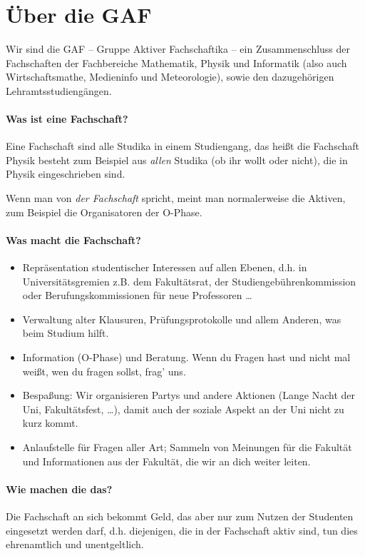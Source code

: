 \section{Über die GAF}

Wir sind die GAF -- Gruppe Aktiver Fachschaftika -- ein
Zusammenschluss der Fachschaften der Fachbereiche
Mathematik,
Physik
und Informatik (also auch Wirtschaftsmathe, Medieninfo und
Meteorologie), sowie den dazugehörigen Lehramtsstudiengängen.

\paragraph{Was ist eine Fachschaft?}

Eine Fachschaft sind alle Studika in einem Studiengang, das heißt die Fachschaft Physik besteht zum Beispiel aus \emph{allen} Studika (ob ihr wollt oder nicht), die in Physik eingeschrieben sind.

Wenn man von \emph{der Fachschaft} spricht, meint man normalerweise die Aktiven,
zum Beispiel die Organisatoren der O-Phase.

\paragraph{Was macht die Fachschaft?}
\begin{itemize}
\item Repräsentation studentischer Interessen auf allen Ebenen, d.h. in Universitätsgremien z.B. dem Fakultätsrat, der Studiengebührenkommission oder Berufungskommissionen für neue Professoren \ldots
\item Verwaltung alter Klausuren, Prüfungsprotokolle und allem Anderen, was beim Studium hilft.
\item Information (O-Phase) und Beratung. Wenn du Fragen hast und nicht mal weißt, wen du fragen sollst, frag' uns.
\item Bespaßung: Wir organisieren Partys und andere Aktionen (Lange Nacht der Uni, Fakultätsfest, \ldots), damit auch der soziale Aspekt an der Uni nicht zu kurz kommt.
\item Anlaufstelle für Fragen aller Art; Sammeln von Meinungen für die Fakultät und Informationen aus der Fakultät, die wir an dich weiter leiten.
\end{itemize}

\paragraph{Wie machen die das?}
Die Fachschaft an sich bekommt Geld, das aber nur zum Nutzen der
Studenten eingesetzt werden darf, d.h. diejenigen, die in der
Fachschaft aktiv sind, tun dies ehrenamtlich und unentgeltlich.

